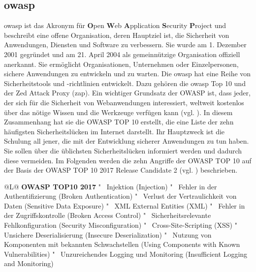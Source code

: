 \subsection{\acs{owasp}}

\acs{owasp} ist das Akronym für \textbf{O}pen \textbf{W}eb
\textbf{A}pplication \textbf{S}ecurity \textbf{P}roject und
beschreibt eine offene Organisation, deren Hauptziel ist, die
Sicherheit von Anwendungen, Diensten und Software zu verbessern.
Sie wurde am 1. Dezember 2001 gegründet und am 21. April 2004 als
gemeinnützige Organisation offiziell anerkannt.  Sie ermöglicht
Organisationen, Unternehmen oder Einzelpersonen, sichere Anwendungen zu
entwickeln und zu warten. Die \acs{owasp} hat eine Reihe von
Sicherheitstools und -richtlinien entwickelt. Dazu gehören die \acs{owasp}
Top 10 und der Zed Attack Proxy (\acs{zap}). Ein wichtiger
Grundsatz der OWASP ist, dass jeder, der sich für die Sicherheit
von Webanwendungen interessiert, weltweit kostenlos über das
nötige Wissen und die Werkzeuge verfügen kann (vgl. \cite{owasp}).
In diesem Zusammenhang hat sie die OWASP TOP 10 erstellt, die eine
Liste der zehn häufigsten Sicherheitslücken im Internet
darstellt. Ihr Hauptzweck ist die Schulung all jener, die mit der
Entwicklung sicherer Anwendungen zu tun haben.  Sie sollen über die
üblichsten Sicherheitslücken informiert werden und dadurch diese
vermeiden.  Im Folgenden werden die zehn Angriffe der OWASP TOP
10 auf der Basis der OWASP TOP 10 2017 
Release Candidate 2 (vgl. \cite{Stock2017}) beschrieben.

\begin{table}[h]
    \begin{tabulary}{\textwidth}{@{}L@{}}
        \toprule
        \textbf{OWASP TOP10 2017} \tabularnewline{}"~ Injektion (Injection)
        "~ Fehler in der Authentifizierung (Broken Authentication)
        "~ Verlust der Vertraulichkeit von Daten (Sensitive Data Exposure)
        "~ XML External Entities (XML)
        "~ Fehler in der Zugriffskontrolle (Broken Access Control)
        "~ Sicherheitsrelevante Fehlkonfiguration (Security Misconfiguration)
        "~ Cross-Site-Scripting (XSS)
        "~ Unsichere Deserialisierung (Insecure Deserialization)
        "~ Nutzung von Komponenten mit bekannten Schwachstellen (Using Components with Known Vulnerabilities)
        "~ Unzureichendes Logging und Monitoring (Insufficient Logging and Monitoring)
        \tabularnewline\bottomrule
    \end{tabulary}
    \caption{OWASP TOP 10 2017}\label{tab:OWASP_TOP_10}
\end{table}

